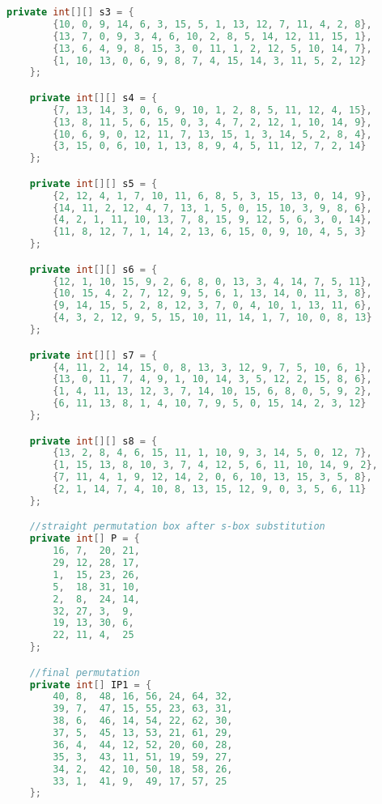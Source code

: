 \begin{lstlisting}[language=Java,basicstyle=\tiny,caption=DESEncryption.java]
    private int[][] s3 = {
        {10, 0, 9, 14, 6, 3, 15, 5, 1, 13, 12, 7, 11, 4, 2, 8},
        {13, 7, 0, 9, 3, 4, 6, 10, 2, 8, 5, 14, 12, 11, 15, 1},
        {13, 6, 4, 9, 8, 15, 3, 0, 11, 1, 2, 12, 5, 10, 14, 7},
        {1, 10, 13, 0, 6, 9, 8, 7, 4, 15, 14, 3, 11, 5, 2, 12}
    };

    private int[][] s4 = {
        {7, 13, 14, 3, 0, 6, 9, 10, 1, 2, 8, 5, 11, 12, 4, 15},
        {13, 8, 11, 5, 6, 15, 0, 3, 4, 7, 2, 12, 1, 10, 14, 9},
        {10, 6, 9, 0, 12, 11, 7, 13, 15, 1, 3, 14, 5, 2, 8, 4},
        {3, 15, 0, 6, 10, 1, 13, 8, 9, 4, 5, 11, 12, 7, 2, 14}
    };

    private int[][] s5 = {
        {2, 12, 4, 1, 7, 10, 11, 6, 8, 5, 3, 15, 13, 0, 14, 9},
        {14, 11, 2, 12, 4, 7, 13, 1, 5, 0, 15, 10, 3, 9, 8, 6},
        {4, 2, 1, 11, 10, 13, 7, 8, 15, 9, 12, 5, 6, 3, 0, 14},
        {11, 8, 12, 7, 1, 14, 2, 13, 6, 15, 0, 9, 10, 4, 5, 3}
    };

    private int[][] s6 = {
        {12, 1, 10, 15, 9, 2, 6, 8, 0, 13, 3, 4, 14, 7, 5, 11},
        {10, 15, 4, 2, 7, 12, 9, 5, 6, 1, 13, 14, 0, 11, 3, 8},
        {9, 14, 15, 5, 2, 8, 12, 3, 7, 0, 4, 10, 1, 13, 11, 6},
        {4, 3, 2, 12, 9, 5, 15, 10, 11, 14, 1, 7, 10, 0, 8, 13}
    };

    private int[][] s7 = {
        {4, 11, 2, 14, 15, 0, 8, 13, 3, 12, 9, 7, 5, 10, 6, 1},
        {13, 0, 11, 7, 4, 9, 1, 10, 14, 3, 5, 12, 2, 15, 8, 6},
        {1, 4, 11, 13, 12, 3, 7, 14, 10, 15, 6, 8, 0, 5, 9, 2},
        {6, 11, 13, 8, 1, 4, 10, 7, 9, 5, 0, 15, 14, 2, 3, 12}
    };

    private int[][] s8 = {
        {13, 2, 8, 4, 6, 15, 11, 1, 10, 9, 3, 14, 5, 0, 12, 7},
        {1, 15, 13, 8, 10, 3, 7, 4, 12, 5, 6, 11, 10, 14, 9, 2},
        {7, 11, 4, 1, 9, 12, 14, 2, 0, 6, 10, 13, 15, 3, 5, 8},
        {2, 1, 14, 7, 4, 10, 8, 13, 15, 12, 9, 0, 3, 5, 6, 11}
    };

    //straight permutation box after s-box substitution
    private int[] P = {
        16, 7,  20, 21,
        29, 12, 28, 17,
        1,  15, 23, 26,
        5,  18, 31, 10,
        2,  8,  24, 14,
        32, 27, 3,  9,
        19, 13, 30, 6,
        22, 11, 4,  25
    };

    //final permutation
    private int[] IP1 = {
        40, 8,  48, 16, 56, 24, 64, 32,
        39, 7,  47, 15, 55, 23, 63, 31,
        38, 6,  46, 14, 54, 22, 62, 30,
        37, 5,  45, 13, 53, 21, 61, 29,
        36, 4,  44, 12, 52, 20, 60, 28,
        35, 3,  43, 11, 51, 19, 59, 27,
        34, 2,  42, 10, 50, 18, 58, 26,
        33, 1,  41, 9,  49, 17, 57, 25
    };


\end{lstlisting}
